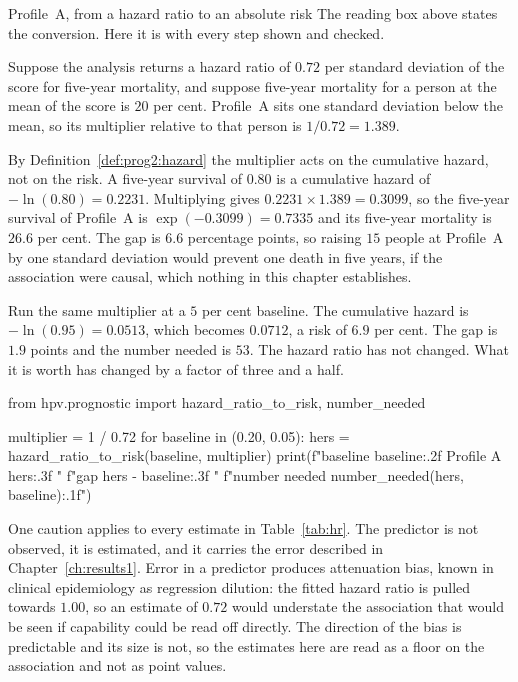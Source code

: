 \begin{workedexample}{Profile~A, from a hazard ratio to an absolute risk}
The reading box above states the conversion. Here it is with every step shown
and checked.

Suppose the analysis returns a hazard ratio of $0.72$ per standard deviation
of the score for five-year mortality, and suppose five-year mortality for a
person at the mean of the score is $20$ per cent. Profile~A sits one standard
deviation below the mean, so its multiplier relative to that person is
$1/0.72=1.389$.

By Definition~\ref{def:prog2:hazard} the multiplier acts on the cumulative
hazard, not on the risk. A five-year survival of $0.80$ is a cumulative hazard
of $-\ln(0.80)=0.2231$. Multiplying gives $0.2231\times1.389=0.3099$, so
the five-year survival of Profile~A is $\exp(-0.3099)=0.7335$ and its five-year
mortality is $26.6$ per cent. The gap is $6.6$ percentage points, so raising
$15$ people at Profile~A by one standard deviation would prevent one death in five
years, if the association were causal, which nothing in this chapter
establishes.

Run the same multiplier at a $5$ per cent baseline. The cumulative hazard is
$-\ln(0.95)=0.0513$, which becomes $0.0712$, a risk of $6.9$ per cent. The gap
is $1.9$ points and the number needed is $53$. The hazard ratio has not
changed. What it is worth has changed by a factor of three and a half.

\begin{wecode}[Python]
from hpv.prognostic import hazard_ratio_to_risk, number_needed

multiplier = 1 / 0.72
for baseline in (0.20, 0.05):
    hers = hazard_ratio_to_risk(baseline, multiplier)
    print(f"baseline {baseline:.2f}  Profile A {hers:.3f}  "
          f"gap {hers - baseline:.3f}  "
          f"number needed {number_needed(hers, baseline):.1f}")
\end{wecode}

\end{workedexample}

One caution applies to every estimate in Table~\ref{tab:hr}. The predictor is not observed, it is estimated, and it carries the error described in Chapter~\ref{ch:results1}. Error in a predictor produces attenuation bias, known in clinical epidemiology as regression dilution: the fitted hazard ratio is pulled towards $1.00$, so an estimate of $0.72$ would understate the association that would be seen if capability could be read off directly. The direction of the bias is predictable and its size is not, so the estimates here are read as a floor on the association and not as point values.

